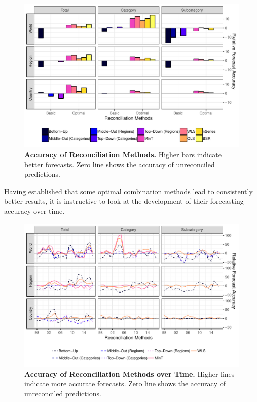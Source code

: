 \documentclass[a4paper,fleqn,11pt]{article}
\begin{document}
 \begin{figure}[H]
	\includegraphics[width=\textwidth]{fig/fig_eval_rmse_relative}
	\caption[Accuracy of Reconciliation Methods]{\textbf{Accuracy of Reconciliation Methods.} Higher bars indicate better forecasts. Zero line shows the accuracy of unreconciled predictions.} \label{fig:rmse}
\end{figure}
Having established that some optimal combination methods lead to consistently better results, it is instructive to look at the development of their forecasting accuracy over time.
 \begin{figure}[H]
	\includegraphics[width=\textwidth]{fig/fig_eval_rmse_time}
	\caption[Accuracy of Reconciliation Methods over Time]{\textbf{Accuracy of Reconciliation Methods over Time.} Higher lines indicate more accurate forecasts. Zero line shows the accuracy of unreconciled predictions.} \label{fig:rmse_time}
\end{figure}
\end{document}
